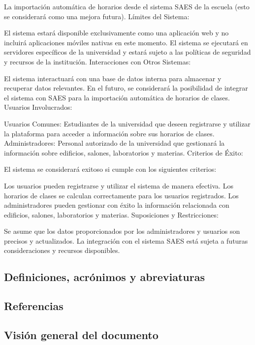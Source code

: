 La importación automática de horarios desde el sistema SAES de la escuela (esto se considerará como una mejora futura).
Límites del Sistema:

El sistema estará disponible exclusivamente como una aplicación web y no incluirá aplicaciones móviles nativas en este momento.
El sistema se ejecutará en servidores específicos de la universidad y estará sujeto a las políticas de seguridad y recursos de la institución.
Interacciones con Otros Sistemas:

El sistema interactuará con una base de datos interna para almacenar y recuperar datos relevantes.
En el futuro, se considerará la posibilidad de integrar el sistema con SAES para la importación automática de horarios de clases.
Usuarios Involucrados:

Usuarios Comunes: Estudiantes de la universidad que deseen registrarse y utilizar la plataforma para acceder a información sobre sus horarios de clases.
Administradores: Personal autorizado de la universidad que gestionará la información sobre edificios, salones, laboratorios y materias.
Criterios de Éxito:

El sistema se considerará exitoso si cumple con los siguientes criterios:

Los usuarios pueden registrarse y utilizar el sistema de manera efectiva.
Los horarios de clases se calculan correctamente para los usuarios registrados.
Los administradores pueden gestionar con éxito la información relacionada con edificios, salones, laboratorios y materias.
Suposiciones y Restricciones:

Se asume que los datos proporcionados por los administradores y usuarios son precisos y actualizados.
La integración con el sistema SAES está sujeta a futuras consideraciones y recursos disponibles.



\subsection{Definiciones, acrónimos y abreviaturas}



\subsection{Referencias}

\subsection{Visión general del documento}
